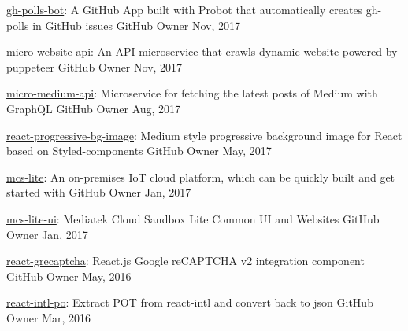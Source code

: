 \begin{cvhonors}
  \cvhonor
    {\href{https://github.com/evenchange4/gh-polls-bot}{gh-polls-bot}: \textmd{A GitHub App built with Probot that automatically creates gh-polls in GitHub issues}}
    {GitHub} %
    {Owner} %
    {Nov, 2017} %

  \cvhonor
    {\href{https://github.com/evenchange4/micro-website-api}{micro-website-api}: \textmd{An API microservice that crawls dynamic website powered by puppeteer}}
    {GitHub} %
    {Owner} %
    {Nov, 2017} %

  \cvhonor
    {\href{https://github.com/evenchange4/micro-medium-api}{micro-medium-api}: \textmd{Microservice for fetching the latest posts of Medium with GraphQL}}
    {GitHub} %
    {Owner} %
    {Aug, 2017} %

  \cvhonor
    {\href{https://github.com/evenchange4/react-progressive-bg-image}{react-progressive-bg-image}: \textmd{Medium style progressive background image for React based on Styled-components}}
    {GitHub} %
    {Owner} %
    {May, 2017} %

  \cvhonor
    {\href{https://github.com/MCS-Lite/mcs-lite}{mcs-lite}: \textmd{An on-premises IoT cloud platform, which can be quickly built and get started with}}
    {GitHub} %
    {Owner} %
    {Jan, 2017} %

  \cvhonor
    {\href{https://github.com/MCS-Lite/mcs-lite}{mcs-lite-ui}: \textmd{Mediatek Cloud Sandbox Lite Common UI and Websites}}
    {GitHub} %
    {Owner} %
    {Jan, 2017} %

  \cvhonor
    {\href{https://github.com/evenchange4/react-grecaptcha}{react-grecaptcha}: \textmd{React.js Google reCAPTCHA v2 integration component}}
    {GitHub} %
    {Owner} %
    {May, 2016} %

  \cvhonor
    {\href{https://github.com/evenchange4/react-intl-po}{react-intl-po}: \textmd{Extract POT from react-intl and convert back to json}}
    {GitHub} %
    {Owner} %
    {Mar, 2016} %

\end{cvhonors}
